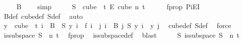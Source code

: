 \begin{isabellebody}
\ \isamarkupfalse%
\ {\isachardoublequoteopen}{\isacharparenleft}{\kern0pt}{\isacharbraceleft}{\kern0pt}{\isacharbraceright}{\kern0pt}\ {\isasymnotin}\ B\ {\isacharbackquote}{\kern0pt}\ {\isacharbraceleft}{\kern0pt}{\isachardot}{\kern0pt}{\isachardot}{\kern0pt}{\isacharless}{\kern0pt}{}{\isacharbraceright}{\kern0pt}{\isacharparenright}{\kern0pt}{\isachardoublequoteclose}\ \isamarkupfalse%
\ simp\isanewline
\ \ \isamarkupfalse%
\ \isamarkupfalse%
\ {\isachardoublequoteopen}S\ {\isasymin}\ {\isacharparenleft}{\kern0pt}cube\ {}\ t{\isacharparenright}{\kern0pt}\ {\isasymrightarrow}\isactrlsub E\ {\isacharparenleft}{\kern0pt}cube\ n\ t{\isacharparenright}{\kern0pt}{\isachardoublequoteclose}\isanewline
\ \ \ \ \isamarkupfalse%
\ f{\isacharunderscore}{\kern0pt}prop\ PiE{\isacharunderscore}{\kern0pt}I\ \isamarkupfalse%
\ B{\isacharunderscore}{\kern0pt}def\ cube{\isacharunderscore}{\kern0pt}def\ S{\isacharunderscore}{\kern0pt}def\ \isamarkupfalse%
\ auto\isanewline
\ \ \isamarkupfalse%
\ \isamarkupfalse%
\ {\isachardoublequoteopen}{\isacharparenleft}{\kern0pt}{\isasymforall}y\ {\isasymin}\ cube\ {}\ t{\isachardot}{\kern0pt}\ {\isacharparenleft}{\kern0pt}{\isasymforall}i\ {\isasymin}\ B\ {}{\isachardot}{\kern0pt}\ S\ y\ i\ {\isacharequal}{\kern0pt}\ f\ i{\isacharparenright}{\kern0pt}\ {\isasymand}\ {\isacharparenleft}{\kern0pt}{\isasymforall}j{\isacharless}{\kern0pt}{}{\isachardot}{\kern0pt}\ {\isasymforall}i\ {\isasymin}\ B\ j{\isachardot}{\kern0pt}\ {\isacharparenleft}{\kern0pt}S\ y{\isacharparenright}{\kern0pt}\ i\ {\isacharequal}{\kern0pt}\ y\ j{\isacharparenright}{\kern0pt}{\isacharparenright}{\kern0pt}{\isachardoublequoteclose}\ \isamarkupfalse%
\ cube{\isacharunderscore}{\kern0pt}def\ S{\isacharunderscore}{\kern0pt}def\ \isamarkupfalse%
\ force\isanewline
\ \ \isamarkupfalse%
\ \isamarkupfalse%
\ {\isachardoublequoteopen}is{\isacharunderscore}{\kern0pt}subspace\ S\ {}\ n\ t{\isachardoublequoteclose}\ \isamarkupfalse%
\ f{\isacharunderscore}{\kern0pt}prop\ \isamarkupfalse%
\ is{\isacharunderscore}{\kern0pt}subspace{\isacharunderscore}{\kern0pt}def\ \isamarkupfalse%
\ blast\isanewline
\ \ \isamarkupfalse%
\ \isamarkupfalse%
\ {\isachardoublequoteopen}{\isasymexists}S{\isachardot}{\kern0pt}\ is{\isacharunderscore}{\kern0pt}subspace\ S\ {}\ n\ t{\isachardoublequoteclose}\ \isamarkupfalse%

\end{isabellebody}
